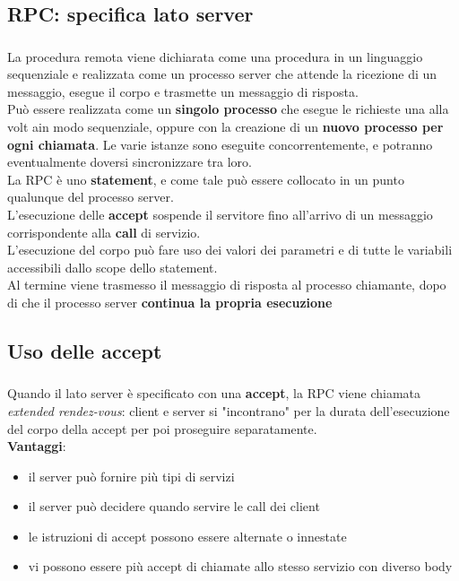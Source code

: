 \documentclass{beamer}
\newenvironment{mainframe}{
	\begin{frame}
		\frametitle{\insertsubsection}
		\framesubtitle{\insertsection}
	}{
	\end{frame}
}
\begin{document}
\subsection{RPC: specifica lato server}
\begin{mainframe}
	La procedura remota viene dichiarata come una procedura in un linguaggio sequenziale e realizzata come un processo server che attende la ricezione di un messaggio, esegue il corpo e trasmette un messaggio di risposta.\\
	Può essere realizzata come un \textbf{singolo processo} che esegue le richieste una alla volt ain modo sequenziale, oppure con la creazione di un \textbf{nuovo processo per ogni chiamata}. Le varie istanze sono eseguite concorrentemente, e potranno eventualmente doversi sincronizzare tra loro.\\
	La RPC è uno \textbf{statement}, e come tale può essere collocato in un punto qualunque del processo server.\\
	L'esecuzione delle \textbf{accept} sospende il servitore fino all'arrivo di un messaggio corrispondente alla \textbf{call} di servizio.\\
	L'esecuzione del corpo può fare uso dei valori dei parametri e di tutte le variabili accessibili dallo scope dello statement.\\
	Al termine viene trasmesso il messaggio di risposta al processo chiamante, dopo di che il processo server \textbf{continua la propria esecuzione}
\end{mainframe}
\subsection{Uso delle accept}
\begin{mainframe}
	Quando il lato server è specificato con una \textbf{accept}, la RPC viene chiamata \textit{extended rendez-vous}: client e server si "incontrano" per la durata dell'esecuzione del corpo della accept per poi proseguire separatamente.\\
	\textbf{Vantaggi}:
	\begin{itemize}
		\item il server può fornire più tipi di servizi
		\item il server può decidere quando servire le call dei client
		\item le istruzioni di accept possono essere alternate o innestate
		\item vi possono essere più accept di chiamate allo stesso servizio con diverso body
	\end{itemize}
\end{mainframe}
\end{document}
